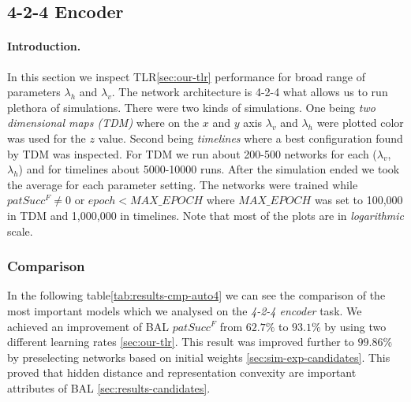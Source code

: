 

\subsection{4-2-4 Encoder} 
\label{sec:results-auto4} 

\paragraph{Introduction.} 
In this section we inspect TLR\ref{sec:our-tlr} performance for broad range of parameters $\lambda_h$ and $\lambda_v$. The network architecture is 4-2-4 what allows us to run plethora of simulations. There were two kinds of simulations. One being \emph{two dimensional maps (TDM)} where on the $x$ and $y$ axis $\lambda_v$ and $\lambda_h$ were plotted color was used for the $z$ value. Second being \emph{timelines} where a best configuration found by TDM was inspected. For TDM we run about 200-500 networks for each ($\lambda_v$, $\lambda_h$) and for timelines about 5000-10000 runs. After the simulation ended we took the average for each parameter setting. The networks were trained while $patSucc^F \neq 0$ or $epoch < MAX\_EPOCH$ where $MAX\_EPOCH$ was set to 100,000 in TDM and 1,000,000 in timelines. Note that most of the plots are in \emph{logarithmic} scale. 

\subsubsection{Comparison} 
\label{sec:tlr-auto4-cmp} 

In the following table\ref{tab:results-cmp-auto4} we can see the comparison of the most important models which we analysed on the \emph{4-2-4 encoder} task. We achieved an improvement of BAL $patSucc^F$ from $62.7\%$ to $93.1\%$ by using two different learning rates \ref{sec:our-tlr}. This result was improved further to $99.86\%$ by preselecting networks based on initial weights \ref{sec:sim-exp-candidates}. This proved that hidden distance and representation convexity are important attributes of BAL \ref{sec:results-candidates}. 

